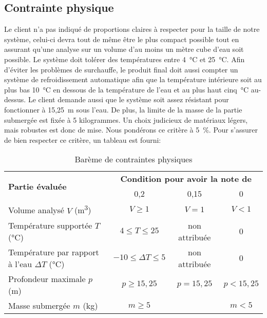 

\subsection{Contrainte physique}
\label{s:cdc_pdd_cntphy}

Le client n’a pas indiqué de proportions claires à respecter pour la taille de notre système, celui-ci devra tout de même être le plus compact possible tout en assurant qu’une analyse sur un volume d’au moins un mètre cube d’eau soit possible.
Le système doit tolérer des températures entre 4~°C et 25~°C.
Afin d’éviter les problèmes de surchauffe, le produit final doit aussi compter un système de refroidissement automatique afin que la température intérieure soit au plus bas 10~°C en dessous de la température de l’eau et au plus haut cinq~°C au-dessus.
Le client demande aussi que le système soit assez résistant pour fonctionner à 15,25~m sous l’eau.
De plus, la limite de la masse de la partie submergée est fixée à 5 kilogrammes.
Un choix judicieux de matériaux légers, mais robustes est donc de mise.
Nous pondérons ce critère à 5~\%. Pour s’assurer de bien respecter ce critère, un tableau est fourni:

\begin{table}[htp]
	\caption{Barème de contraintes physiques}
	\label{tab:cdc_pdd_cntphy}
	\centering
	\begin{tabular}{|l|c|c|c|}
		\hline
		\multirow{2}{*}{\textbf{Partie évaluée}} & \multicolumn{3}{c|}{\textbf{Condition pour avoir la note de}} \\\cline{2-4}
		 & 0,2 & 0,15 & 0 \\\hline
		Volume analysé $V$ (m\textsuperscript{3}) & $V \ge 1$ & $V=1$ & $V<1$  \\\hline
		Température supportée $T$ (°C) & $4 \le T \le 25$  & non attribuée & 0 \\\hline
		Température par rapport à l'eau $\Delta T$ (°C) & $-10 \le \Delta T \le 5$ & non attribuée & 0 \\\hline
		Profondeur maximale $p$ (m) & $p \ge 15,25$ & $p=15,25$ & $p<15,25$    \\\hline
		Masse submergée $m$ (kg) & $m \ge 5$ & & $m < 5$  \\\hline
	\end{tabular}
\end{table}
